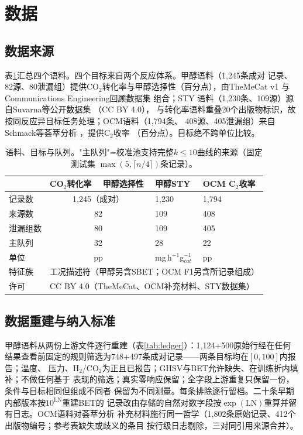 \documentclass[11pt,a4paper]{article}
\begin{document}
\section{数据}\label{sec:data}
\subsection{数据来源}
表\ref{tab:data}汇总四个语料。四个目标来自两个反应体系。甲醇语料（1{,}245条成对
记录、82源、80泄漏组）提供CO$_2$转化率与甲醇选择性（百分点），由TheMeCat v1
\cite{toldy} 与Communications Engineering回顾数据集 \cite{yan} 组合；STY
语料（1{,}230条、109源）源自Suvarna等公开数据集 \cite{suvarna}（CC BY 4.0），
与转化率语料重叠20个出版物标识，故按同反应异目标任务处理；OCM语料（1{,}794条、
408源、405泄漏组）来自Schmack等荟萃分析 \cite{schmack}，提供C$_2$收率
（百分点）。目标绝不跨单位比较。

\begin{table}[t]
\centering\small
\caption{语料、目标与队列。"主队列"=校准池支持完整$k\le10$曲线的来源（固定测试集
$\max(5,\lceil n/4\rceil)$条记录）。}
\label{tab:data}
\begin{tabularx}{\linewidth}{lXXXX}
\toprule
 & CO$_2$转化率 & 甲醇选择性 & 甲醇STY & OCM C$_2$收率 \\
\midrule
记录数 & \multicolumn{2}{c}{1{,}245（成对）} & 1{,}230 & 1{,}794 \\
来源数 & \multicolumn{2}{c}{82} & 109 & 408 \\
泄漏组数 & \multicolumn{2}{c}{80} & 109 & 405 \\
主队列 & \multicolumn{2}{c}{32} & 28 & 22 \\
单位 & \multicolumn{2}{c}{pp} & mg\,h$^{-1}$g$_{cat}^{-1}$ & pp \\
特征族 & \multicolumn{4}{l}{工况描述符（甲醇另含SBET；OCM F1另含所记录组成）} \\
许可 & \multicolumn{4}{l}{CC BY 4.0（TheMeCat、OCM补充材料、STY数据集）} \\
\bottomrule
\end{tabularx}
\end{table}

\subsection{数据重建与纳入标准}
甲醇语料从两份上游文件逐行重建（表\ref{tab:ledger}）：1{,}124+500原始行经在任何
结果查看前固定的规则筛选为748+497条成对记录——两条目标均在$[0,100]$内报告；温度、
压力、H$_2$/CO$_2$为正且已报告；GHSV与BET允许缺失、在训练折内填补；不做任何基于
表现的筛选；真实零响应保留；全字段上游重复只保留一份，条件与目标相同但组成不同者
保留为不同测量。每条排除逐行留档。二十条早期内部版本按$10^{\mathrm{LN}}$重建BET的
记录改由存储的自然对数字段按$\exp(\mathrm{LN})$重算并留有日志。OCM语料对荟萃分析
补充材料施行同一哲学（1{,}802条原始记录、412个出版物编号；参考表缺失或歧义的条目
按行级日志剔除，三对同引用来源合并）。
\end{document}
